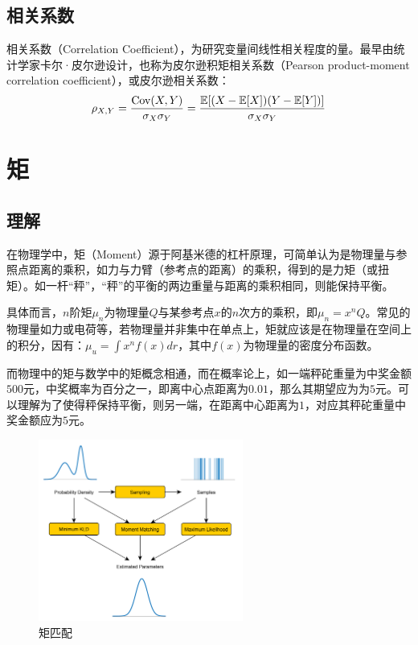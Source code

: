 \documentclass[11pt]{article}
\begin{document}
\subsection{相关系数}

相关系数（Correlation Coefficient），为研究变量间线性相关程度的量。最早由统计学家卡尔·皮尔逊设计，也称为皮尔逊积矩相关系数（Pearson product-moment correlation coefficient），或皮尔逊相关系数：
\begin{equation*}
    \rho_{X,Y} = \frac{\operatorname{Cov}(X,Y)}{\sigma_X\sigma_Y}
    = \frac{\mathbb{E}[(X-\mathbb{E}[X])(Y-\mathbb{E}[Y])]}{\sigma_X\sigma_Y}
\end{equation*}

\section{矩}

\subsection{理解}

在物理学中，矩（Moment）源于阿基米德的杠杆原理，可简单认为是物理量与参照点距离的乘积，如力与力臂（参考点的距离）的乘积，得到的是力矩（或扭矩）。如一杆“秤”，“秤”的平衡的两边重量与距离的乘积相同，则能保持平衡。

具体而言，$n$阶矩$\mu_n$为物理量$Q$与某参考点$x$的$n$次方的乘积，即$\mu_n = x^n Q$。常见的物理量如力或电荷等，若物理量并非集中在单点上，矩就应该是在物理量在空间上的积分，因有：$\mu_u = \int x^n f(x) dr$，其中$f(x)$为物理量的密度分布函数。

而物理中的矩与数学中的矩概念相通，而在概率论上，如一端秤砣重量为中奖金额$500$元，中奖概率为百分之一，即离中心点距离为$0.01$，那么其期望应为为$5$元。可以理解为了使得秤保持平衡，则另一端，在距离中心距离为$1$，对应其秤砣重量中奖金额应为$5$元。

\begin{figure}[ht!]
    \centering
    \includegraphics[width=0.6\textwidth]{fig/moment-matching.png}
    \caption{矩匹配}
    \label{fig:moment-match}
\end{figure}
\end{document}
